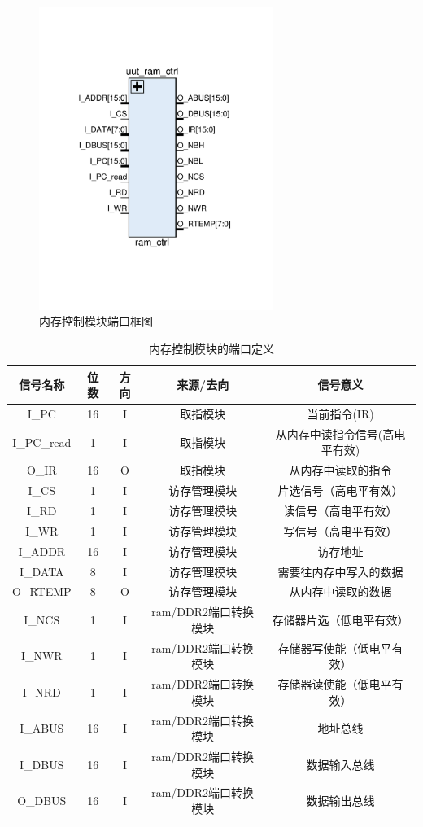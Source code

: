 \documentclass[forprint]{WHUBachelor}
\begin{document}
\begin{figure}[H]
  \centering
  \includegraphics[width=3in]{figures/ports/ram_ctrl.pdf}
  \caption{内存控制模块端口框图}
  \label{fig:ports:ram_ctrl}
\end{figure}

\begin{table}[H]
  \centering
  \begin{tabular}{c c c c c}
    \hline
    信号名称 & 位数 & 方向 & 来源/去向 & 信号意义 \\
    \hline
    I\_PC & 16 & I & 取指模块 & 当前指令(IR) \\
    I\_PC\_read & 1 & I & 取指模块 & 从内存中读指令信号(高电平有效) \\
    O\_IR & 16 & O & 取指模块 & 从内存中读取的指令\\
    I\_CS & 1 & I & 访存管理模块 & 片选信号（高电平有效） \\
    I\_RD & 1 & I & 访存管理模块 & 读信号（高电平有效） \\
    I\_WR & 1 & I & 访存管理模块 & 写信号（高电平有效） \\
    I\_ADDR & 16 & I & 访存管理模块 & 访存地址 \\
    I\_DATA & 8 & I & 访存管理模块 & 需要往内存中写入的数据 \\
    O\_RTEMP & 8 & O & 访存管理模块 & 从内存中读取的数据 \\
    I\_NCS & 1 & I & ram/DDR2端口转换模块 & 存储器片选（低电平有效） \\
    I\_NWR & 1 & I & ram/DDR2端口转换模块 & 存储器写使能（低电平有效） \\
    I\_NRD & 1 & I & ram/DDR2端口转换模块 & 存储器读使能（低电平有效） \\
    I\_ABUS & 16 & I & ram/DDR2端口转换模块 & 地址总线 \\
    I\_DBUS & 16 & I & ram/DDR2端口转换模块 & 数据输入总线 \\
    O\_DBUS & 16 & I & ram/DDR2端口转换模块 & 数据输出总线 \\
    \hline
  \end{tabular}
  \caption{内存控制模块的端口定义}
  \label{tab:ports:ram_ctrl}
\end{table}
\end{document}
